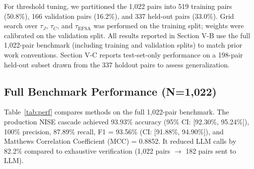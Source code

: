 \documentclass[conference]{IEEEtran}
\begin{document}
For threshold tuning, we partitioned the 1,022 pairs into 519 training pairs (50.8\%), 166 validation pairs (16.2\%), and 337 held-out pairs (33.0\%).
Grid search over $\tau_J$, $\tau_C$, and $\tau_{\text{EFSA}}$ was performed on the training split; weights were calibrated on the validation split.
All results reported in Section V-B use the full 1,022-pair benchmark (including training and validation splits) to match prior work conventions.
Section V-C reports test-set-only performance on a 198-pair held-out subset drawn from the 337 holdout pairs to assess generalization.

\subsection{Full Benchmark Performance (N=1,022)}
Table~\ref{tab:perf} compares methods on the full 1,022-pair benchmark.
The production NISE cascade achieved 93.93\% accuracy (95\% CI: [92.30\%, 95.24\%]), 100\% precision, 87.89\% recall, F1 = 93.56\% (CI: [91.88\%, 94.90\%]), and Matthews Correlation Coefficient (MCC) = 0.8852.
It reduced LLM calls by 82.2\% compared to exhaustive verification (1,022 pairs $\to$ 182 pairs sent to LLM).

\begin{table}[!t]
\centering
\caption{Comparative Performance on Full 1,022-Pair Benchmark}
\label{tab:perf}
\end{table}
\end{document}
